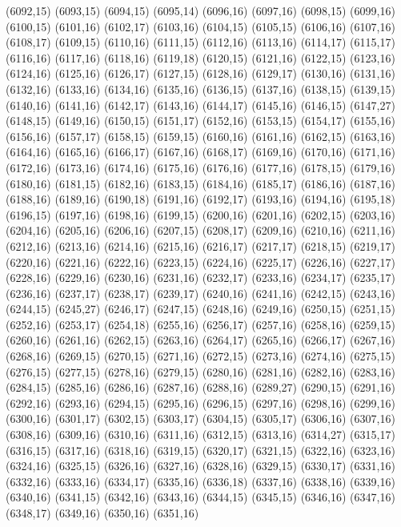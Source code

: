 (6092,15)
(6093,15)
(6094,15)
(6095,14)
(6096,16)
(6097,16)
(6098,15)
(6099,16)
(6100,15)
(6101,16)
(6102,17)
(6103,16)
(6104,15)
(6105,15)
(6106,16)
(6107,16)
(6108,17)
(6109,15)
(6110,16)
(6111,15)
(6112,16)
(6113,16)
(6114,17)
(6115,17)
(6116,16)
(6117,16)
(6118,16)
(6119,18)
(6120,15)
(6121,16)
(6122,15)
(6123,16)
(6124,16)
(6125,16)
(6126,17)
(6127,15)
(6128,16)
(6129,17)
(6130,16)
(6131,16)
(6132,16)
(6133,16)
(6134,16)
(6135,16)
(6136,15)
(6137,16)
(6138,15)
(6139,15)
(6140,16)
(6141,16)
(6142,17)
(6143,16)
(6144,17)
(6145,16)
(6146,15)
(6147,27)
(6148,15)
(6149,16)
(6150,15)
(6151,17)
(6152,16)
(6153,15)
(6154,17)
(6155,16)
(6156,16)
(6157,17)
(6158,15)
(6159,15)
(6160,16)
(6161,16)
(6162,15)
(6163,16)
(6164,16)
(6165,16)
(6166,17)
(6167,16)
(6168,17)
(6169,16)
(6170,16)
(6171,16)
(6172,16)
(6173,16)
(6174,16)
(6175,16)
(6176,16)
(6177,16)
(6178,15)
(6179,16)
(6180,16)
(6181,15)
(6182,16)
(6183,15)
(6184,16)
(6185,17)
(6186,16)
(6187,16)
(6188,16)
(6189,16)
(6190,18)
(6191,16)
(6192,17)
(6193,16)
(6194,16)
(6195,18)
(6196,15)
(6197,16)
(6198,16)
(6199,15)
(6200,16)
(6201,16)
(6202,15)
(6203,16)
(6204,16)
(6205,16)
(6206,16)
(6207,15)
(6208,17)
(6209,16)
(6210,16)
(6211,16)
(6212,16)
(6213,16)
(6214,16)
(6215,16)
(6216,17)
(6217,17)
(6218,15)
(6219,17)
(6220,16)
(6221,16)
(6222,16)
(6223,15)
(6224,16)
(6225,17)
(6226,16)
(6227,17)
(6228,16)
(6229,16)
(6230,16)
(6231,16)
(6232,17)
(6233,16)
(6234,17)
(6235,17)
(6236,16)
(6237,17)
(6238,17)
(6239,17)
(6240,16)
(6241,16)
(6242,15)
(6243,16)
(6244,15)
(6245,27)
(6246,17)
(6247,15)
(6248,16)
(6249,16)
(6250,15)
(6251,15)
(6252,16)
(6253,17)
(6254,18)
(6255,16)
(6256,17)
(6257,16)
(6258,16)
(6259,15)
(6260,16)
(6261,16)
(6262,15)
(6263,16)
(6264,17)
(6265,16)
(6266,17)
(6267,16)
(6268,16)
(6269,15)
(6270,15)
(6271,16)
(6272,15)
(6273,16)
(6274,16)
(6275,15)
(6276,15)
(6277,15)
(6278,16)
(6279,15)
(6280,16)
(6281,16)
(6282,16)
(6283,16)
(6284,15)
(6285,16)
(6286,16)
(6287,16)
(6288,16)
(6289,27)
(6290,15)
(6291,16)
(6292,16)
(6293,16)
(6294,15)
(6295,16)
(6296,15)
(6297,16)
(6298,16)
(6299,16)
(6300,16)
(6301,17)
(6302,15)
(6303,17)
(6304,15)
(6305,17)
(6306,16)
(6307,16)
(6308,16)
(6309,16)
(6310,16)
(6311,16)
(6312,15)
(6313,16)
(6314,27)
(6315,17)
(6316,15)
(6317,16)
(6318,16)
(6319,15)
(6320,17)
(6321,15)
(6322,16)
(6323,16)
(6324,16)
(6325,15)
(6326,16)
(6327,16)
(6328,16)
(6329,15)
(6330,17)
(6331,16)
(6332,16)
(6333,16)
(6334,17)
(6335,16)
(6336,18)
(6337,16)
(6338,16)
(6339,16)
(6340,16)
(6341,15)
(6342,16)
(6343,16)
(6344,15)
(6345,15)
(6346,16)
(6347,16)
(6348,17)
(6349,16)
(6350,16)
(6351,16)

